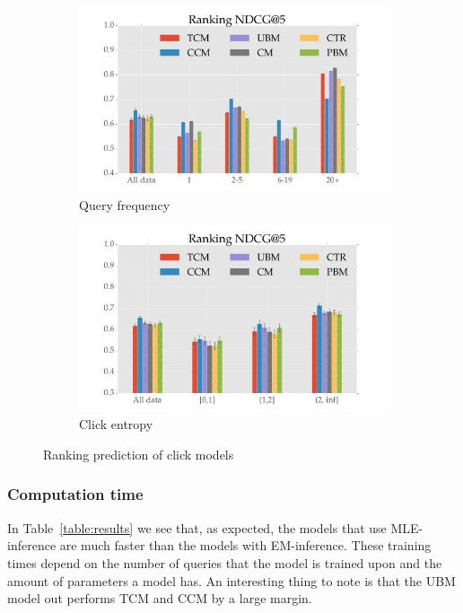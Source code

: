 \begin{figure}
	\centering
	\begin{subfigure}[b]{.49\textwidth}
		\centering
		\includegraphics[width=\textwidth]{figures/Ranking_NDCG_qf.pdf}
		\caption{Query frequency}
		\label{fig:rank_qf}
	\end{subfigure}
	\begin{subfigure}[b]{.49\textwidth}
		\centering
		\includegraphics[width=\textwidth]{figures/Ranking_NDCG_ce.pdf}
		\caption{Click entropy}
		\label{fig:rank_ce}
	\end{subfigure}
	\caption{Ranking prediction of click models}
	\label{fig:rank}
\end{figure}


\subsubsection{Computation time}
In Table~\ref{table:results} we see that, as expected, the models that use MLE-inference are much faster than the models with EM-inference. These training times depend on the number of queries that the model is trained upon and the amount of parameters a model has. An interesting thing to note is that the UBM model out performs TCM and CCM by a large margin.

